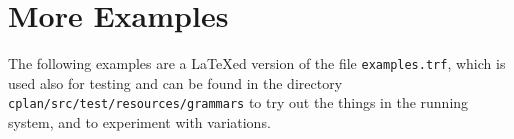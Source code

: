 \documentclass[11pt,a4paper]{article}
\begin{document}
\newpage
\appendix
\section{More Examples}

The following examples are a \LaTeX{}ed version of the file
\texttt{examples.trf}, which is used also for testing and can be found in the
directory \texttt{cplan/src/test/resources/grammars} to try out the things
in the running system, and to experiment with variations.\\


\end{document}
